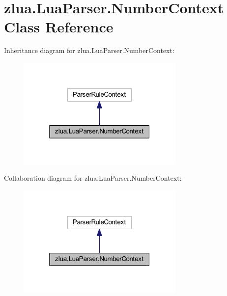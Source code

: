 \hypertarget{classzlua_1_1_lua_parser_1_1_number_context}{}\section{zlua.\+Lua\+Parser.\+Number\+Context Class Reference}
\label{classzlua_1_1_lua_parser_1_1_number_context}


Inheritance diagram for zlua.\+Lua\+Parser.\+Number\+Context\+:
\nopagebreak
\begin{figure}[H]
\begin{center}
\leavevmode
\includegraphics[width=232pt]{classzlua_1_1_lua_parser_1_1_number_context__inherit__graph}
\end{center}
\end{figure}


Collaboration diagram for zlua.\+Lua\+Parser.\+Number\+Context\+:
\nopagebreak
\begin{figure}[H]
\begin{center}
\leavevmode
\includegraphics[width=232pt]{classzlua_1_1_lua_parser_1_1_number_context__coll__graph}
\end{center}
\end{figure}
